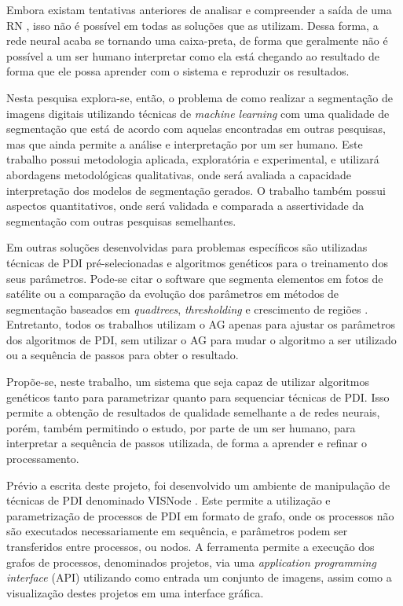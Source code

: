 \documentclass[12pt,oneside,a4paper,english,french,spanish,brazil,]{abntex2}
\begin{document}
Embora existam tentativas anteriores de analisar e compreender a saída de uma RN \cite{zeiler:2014}, isso não é possível em todas as soluções que as utilizam. Dessa forma, a rede neural acaba se tornando uma caixa-preta, de forma que geralmente não é possível a um ser humano interpretar como ela está chegando ao resultado de forma que ele possa aprender com o sistema e reproduzir os resultados.

Nesta pesquisa explora-se, então, o problema de como realizar a segmentação de imagens digitais utilizando técnicas de \textit{machine learning} com uma qualidade de segmentação que está de acordo com aquelas encontradas em outras pesquisas, mas que ainda permite a análise e interpretação por um ser humano. Este trabalho possui metodologia aplicada, exploratória e experimental, e utilizará abordagens metodológicas qualitativas, onde será avaliada a capacidade interpretação dos modelos de segmentação gerados. O trabalho também possui aspectos quantitativos, onde será validada e comparada a assertividade da segmentação com outras pesquisas semelhantes.

Em outras soluções desenvolvidas para problemas específicos são utilizadas técnicas de PDI pré-selecionadas e algoritmos genéticos \cite{holland:1992} para o treinamento dos seus parâmetros. Pode-se citar o software que segmenta elementos em fotos de satélite \cite{costa:2010} ou a comparação da evolução dos parâmetros em métodos de segmentação baseados em \textit{quadtrees}, \textit{thresholding} e crescimento de regiões \cite{matias:2007}. Entretanto, todos os trabalhos utilizam o AG apenas para ajustar os parâmetros dos algoritmos de PDI, sem utilizar o AG para mudar o algoritmo a ser utilizado ou a sequência de passos para obter o resultado.

Propõe-se, neste trabalho, um sistema que seja capaz de utilizar algoritmos genéticos tanto para parametrizar quanto para sequenciar técnicas de PDI. Isso permite a obtenção de resultados de qualidade semelhante a de redes neurais, porém, também permitindo o estudo, por parte de um ser humano, para interpretar a sequência de passos utilizada, de forma a aprender e refinar o processamento.

Prévio a escrita deste projeto, foi desenvolvido um ambiente de manipulação de técnicas de PDI denominado VISNode \cite{visnode:2018}. Este permite a utilização e parametrização de processos de PDI em formato de grafo, onde os processos não são executados necessariamente em sequência, e parâmetros podem ser transferidos entre processos, ou nodos. A ferramenta permite a execução dos grafos de processos, denominados projetos, via uma \textit{application programming interface} (API) utilizando como entrada um conjunto de imagens, assim como a visualização destes projetos em uma interface gráfica.
\end{document}
